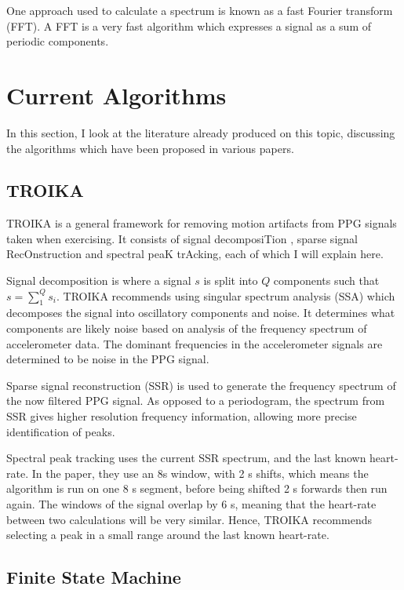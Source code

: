\documentclass[12pt,a4paper,twoside,openright]{report}
\begin{document}
One approach used to calculate a spectrum is known as a fast Fourier transform
(FFT). A FFT is a very fast algorithm which expresses a signal as a sum of
periodic components.


\section{Current Algorithms}

In this section, I look at the literature already produced on this topic,
discussing the algorithms which have been proposed in various papers.

\subsection{TROIKA}

TROIKA \cite{Zhang15} is a general framework for removing motion artifacts
from PPG signals taken when exercising. It consists of signal decomposiTion
, sparse signal RecOnstruction and spectral peaK trAcking, each of which I will
explain here.

Signal decomposition is where a signal \(s\) is split into \(Q\) components
such that $s=\sum_1^Q s_i$. TROIKA recommends using singular spectrum analysis
(SSA) which decomposes the signal into oscillatory components and noise. It
determines what components are likely noise based on analysis of the frequency
spectrum of accelerometer data. The dominant frequencies in the accelerometer
signals are determined to be noise in the PPG signal.

Sparse signal reconstruction (SSR) is used to generate the frequency spectrum of the
now filtered PPG signal. As opposed to a periodogram, the spectrum from SSR
gives higher resolution frequency information, allowing more precise
identification of peaks.

Spectral peak tracking uses the current SSR spectrum, and the last known
heart-rate. In the paper, they use an 8s window, with 2 s shifts, which means
the algorithm is run on one 8 s segment, before being shifted 2 s forwards then
run again.
The windows of the signal overlap by 6 s, meaning that the heart-rate
between two calculations will be very similar. Hence, TROIKA recommends
selecting a peak in a small range around the last known heart-rate.

\subsection{Finite State Machine}
\end{document}
